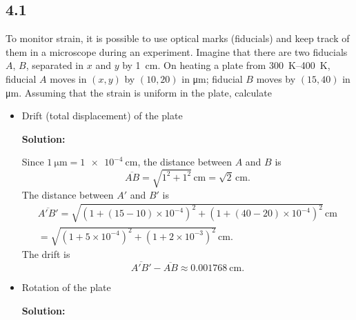 \documentclass[12pt]{article}
\begin{document}
\subsection{4.1}
To monitor strain, it is possible to use optical marks (fiducials) and keep track of them in a
microscope during an experiment. Imagine that there are two fiducials $A$, $B$, separated in $x$ and $y$
by \SI{1}{\centi\meter}. On heating a plate from \SIrange{300}{400}{\kelvin}, fiducial $A$ moves in $(x, y)$ by $(10, 20)$ in
\si{\micro\meter};
fiducial $B$ moves by $(15, 40)$ in \si{\micro\meter}. Assuming that the strain is uniform in the plate, calculate
\begin{itemize}
	\item Drift (total displacement) of the plate

	      \textbf{Solution:}

	      Since $\SI{1}{\micro\meter} = \SI{1e-4}{\centi\meter}$,
	      the distance between $A$ and $B$ is
	      \begin{equation}
		      \overline{AB} = \sqrt{1^2 + 1^2}\,\si{\centi\meter} = \sqrt{2}\,\si{\centi\meter}.
	      \end{equation}
	      The distance between $A'$ and $B'$ is
	      \begin{multline}
		      \overline{A' B'} = \sqrt{(1 + (15 - 10) \times 10^{-4})^2 + (1 + (40 - 20) \times 10^{-4})^2}\,\si{\centi\meter}\\
		      = \sqrt{(1 + 5 \times 10^{-4})^2 + (1 + 2 \times 10^{-3})^2}\,\si{\centi\meter}.
	      \end{multline}
	      The drift is
	      \begin{equation}
		      \overline{A' B'} - \overline{AB} \approx \SI{0.001768}{\centi\meter}.
	      \end{equation}

	\item Rotation of the plate

	      \textbf{Solution:}


\end{itemize}
\end{document}
